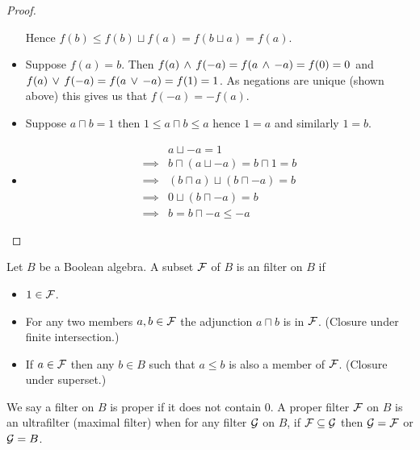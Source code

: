 \begin{proof}
\begin{itemize}
            Hence $f(b) \leq f(b) \sqcup f(a) = f(b \sqcup a) = f(a)$.
        \item Suppose $f(a) = b$.
            Then $f(a) \, \land \, f(- a) = f(a \, \land \, - a) = f(0) = 0$
            and $f(a) \, \lor \, f(- a) = f(a \, \lor \, - a) = f(1) = 1$.
            As negations are unique (shown above) 
            this gives us that $f(- a) = - f(a)$.
        \item Suppose $a \sqcap b = 1$ then $1 \leq a \sqcap b \leq a$ hence $1 = a$
            and similarly $1 = b$.
        \item\begin{align*}
                &a \sqcup - a = 1\\
                \implies & b \sqcap (a \sqcup - a) = b \sqcap 1 = b\\
                \implies & (b \sqcap a) \sqcup (b \sqcap - a) = b\\
                \implies & 0 \sqcup (b \sqcap - a) = b\\
                \implies & b = b \sqcap - a \leq - a
            \end{align*}
    \end{itemize}
\end{proof}


\begin{dfn}
    Let $B$ be a Boolean algebra.
    A subset $\mathcal{F}$ of $B$ is an filter on $B$ if
    \begin{itemize}
        \item $1 \in \mathcal{F}$.
        \item For any two members $a,b \in \mathcal{F}$ the adjunction
            $a \sqcap b$ is in $\mathcal{F}$. (Closure under finite intersection.)
        \item If $a \in \mathcal{F}$ then any $b \in B$ 
            such that $a \leq b$ is also a member of $\mathcal{F}$. 
            (Closure under superset.)
    \end{itemize}
    We say a filter on $B$ is proper if it does not contain $0$.
    A proper filter $\mathcal{F}$ on $B$ is an ultrafilter (maximal filter) when
    for any filter $\mathcal{G}$ on $B$, if $\mathcal{F} \subseteq \mathcal{G}$ then $\mathcal{G} = \mathcal{F}$ 
    or $\mathcal{G} = B$.
\end{dfn}

